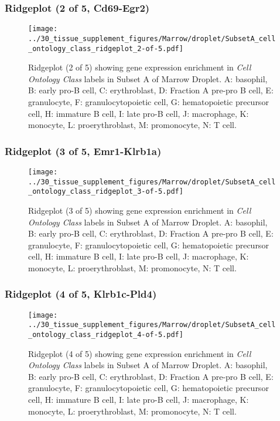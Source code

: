 \clearpage

\subsubsection{Ridgeplot (2 of 5, Cd69-Egr2)}
\begin{figure}[h]
\centering
\texttt{[image: ../30\_tissue\_supplement\_figures/Marrow/droplet/SubsetA\_cell\_ontology\_class\_ridgeplot\_2-of-5.pdf]}

\caption{ Ridgeplot (2 of 5)  showing gene expression enrichment in \emph{Cell Ontology Class} labels in Subset A of Marrow Droplet. A: basophil, B: early pro-B cell, C: erythroblast, D: Fraction A pre-pro B cell, E: granulocyte, F: granulocytopoietic cell, G: hematopoietic precursor cell, H: immature B cell, I: late pro-B cell, J: macrophage, K: monocyte, L: proerythroblast, M: promonocyte, N: T cell.}
\end{figure}


\clearpage

\subsubsection{Ridgeplot (3 of 5, Emr1-Klrb1a)}
\begin{figure}[h]
\centering
\texttt{[image: ../30\_tissue\_supplement\_figures/Marrow/droplet/SubsetA\_cell\_ontology\_class\_ridgeplot\_3-of-5.pdf]}

\caption{ Ridgeplot (3 of 5)  showing gene expression enrichment in \emph{Cell Ontology Class} labels in Subset A of Marrow Droplet. A: basophil, B: early pro-B cell, C: erythroblast, D: Fraction A pre-pro B cell, E: granulocyte, F: granulocytopoietic cell, G: hematopoietic precursor cell, H: immature B cell, I: late pro-B cell, J: macrophage, K: monocyte, L: proerythroblast, M: promonocyte, N: T cell.}
\end{figure}


\clearpage

\subsubsection{Ridgeplot (4 of 5, Klrb1c-Pld4)}
\begin{figure}[h]
\centering
\texttt{[image: ../30\_tissue\_supplement\_figures/Marrow/droplet/SubsetA\_cell\_ontology\_class\_ridgeplot\_4-of-5.pdf]}

\caption{ Ridgeplot (4 of 5)  showing gene expression enrichment in \emph{Cell Ontology Class} labels in Subset A of Marrow Droplet. A: basophil, B: early pro-B cell, C: erythroblast, D: Fraction A pre-pro B cell, E: granulocyte, F: granulocytopoietic cell, G: hematopoietic precursor cell, H: immature B cell, I: late pro-B cell, J: macrophage, K: monocyte, L: proerythroblast, M: promonocyte, N: T cell.}
\end{figure}


